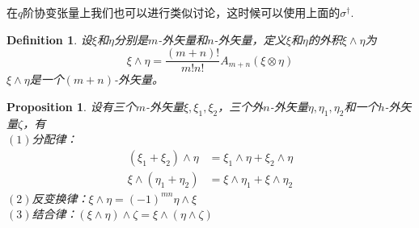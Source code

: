 \documentclass[11pt,a4paper,openany]{book}%
\theoremstyle{plain}%
\newtheorem{pro}{Proposition}[chapter]%
\newtheorem{defi}{Definition}[chapter]%
\newcommand{\NO}[1]{{$(#1)$}}%
\begin{document}
在$q$阶协变张量上我们也可以进行类似讨论，这时候可以使用上面的$\sigma^\dag$.
\begin{defi}
设$\xi$和$\eta$分别是$m$-外矢量和$n$-外矢量，定义$\xi$和$\eta$的外积$\xi \wedge \eta$为
\[
\xi \wedge \eta=\frac{(m+n)!}{m!n!}A_{m+n}(\xi \otimes \eta)
\]
$\xi \wedge \eta$是一个$(m+n)$-外矢量。
\end{defi}
\begin{pro}
设有三个$m$-外矢量$\xi,\xi_1,\xi_2$，三个外$n$-外矢量$\eta,\eta_1,\eta_2$和一个$h$-外矢量$\zeta$，有\\
\NO{1}分配律：
\begin{equation*}
\begin{split}
(\xi_1+\xi_2)\wedge \eta&=\xi_1 \wedge \eta+\xi_2 \wedge \eta \\
\xi \wedge (\eta_1+\eta_2)&=\xi \wedge \eta_1+\xi \wedge \eta_2
\end{split}
\end{equation*}
\NO{2}反变换律：$\xi \wedge \eta=(-1)^{mn}\eta \wedge \xi$\\
\NO{3}结合律：$(\xi \wedge \eta)\wedge \zeta=\xi \wedge (\eta\wedge \zeta)$
\end{pro}
\end{document}
